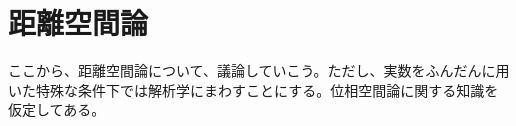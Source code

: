 \documentclass[a4paper]{jsarticle}
\begin{document}
\section{距離空間論}
ここから、距離空間論について、議論していこう。ただし、実数をふんだんに用いた特殊な条件下では解析学にまわすことにする。位相空間論に関する知識を仮定してある。
\end{document}
